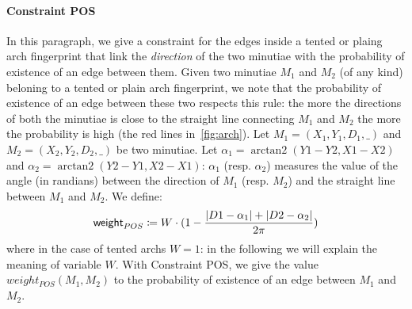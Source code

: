 \documentclass[8pt]{article}
\DeclareMathOperator{\arctantwo}{arctan2}
\begin{document}
\paragraph{Constraint POS}
In this paragraph, we give a constraint for the edges inside a tented
or plaing arch fingerprint that link the \emph{direction} of the two
minutiae with the probability of existence of an edge between them.
Given two minutiae $M_1$ and $M_2$ (of any kind) beloning to a tented 
or plain arch fingerprint,
we note that the probability of existence of an edge between these two
respects this rule: the more the directions of both the minutiae
is close to the straight line connecting $M_1$ and $M_2$ the more the
probability is high (the red lines in~\cref{fig:arch}).
Let $M_1=(X_1,Y_1,D_1,\_)$ and $M_2=(X_2,Y_2,D_2,\_)$ be two minutiae.
Let $\alpha_1=\arctantwo(Y1-Y2,X1-X2)$ and $\alpha_2=\arctantwo(Y2-Y1,X2-X1)$:
$\alpha_1$ (resp. $\alpha_2$) measures the value of the angle (in randians) between 
the direction of $M_1$ (resp. $M_2$) and the straight line between $M_1$ and
$M_2$.
We define:
  \begin{align*}
    \textsf{weight}_{POS} \coloneqq
    W \cdot (1-\frac{\lvert D1-\alpha_1\rvert+\lvert D2-\alpha_2\rvert}{2\pi})
  \end{align*}
where in the case of tented archs $W=1$: in the following we will explain the
meaning of variable $W$.
With Constraint POS, we give the value $weight_{POS}(M_1,M_2)$ to the probability 
of existence of an edge between $M_1$ and $M_2$.
\end{document}
